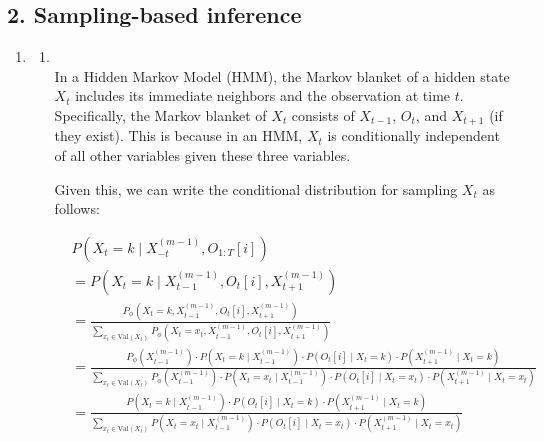 \documentclass[a4 paper]{article}
\begin{document}
\subsection*{2. Sampling-based inference}


\begin{enumerate}
    \item {}
    
    \begin{enumerate}
        \item {} \\

        In a Hidden Markov Model (HMM), the Markov blanket of a hidden state $X_t$ includes its immediate neighbors and the observation at time $t$. Specifically, the Markov blanket of $X_t$ consists of $X_{t-1}$, $O_t$, and $X_{t+1}$ (if they exist). This is because in an HMM, $X_t$ is conditionally independent of all other variables given these three variables. 

        Given this, we can write the conditional distribution for sampling $X_t$ as follows:

        \begin{align*}
            &P(X_t = k \mid X_{-t}^{(m-1)}, O_{1:T}[i]) \\
            &= P(X_t = k \mid X_{t-1}^{(m-1)}, O_t[i], X_{t+1}^{(m-1)}) \\
            &= \frac{P_\phi(X_t = k, X_{t-1}^{(m-1)}, O_t[i], X_{t+1}^{(m-1)})}{\sum_{x_t \in \text{Val}(X_t)} P_\phi(X_t = x_t, X_{t-1}^{(m-1)}, O_t[i], X_{t+1}^{(m-1)})} \\
            &= \frac{P_\phi(X_{t-1}^{(m-1)}) \cdot P(X_t = k \mid X_{t-1}^{(m-1)}) \cdot P(O_t[i] \mid X_t = k) \cdot P(X_{t+1}^{(m-1)} \mid X_t = k)}{\sum_{x_t \in \text{Val}(X_t)} P_\phi(X_{t-1}^{(m-1)}) \cdot P(X_t = x_t \mid X_{t-1}^{(m-1)}) \cdot P(O_t[i] \mid X_t = x_t) \cdot P(X_{t+1}^{(m-1)} \mid X_t = x_t)} \\
            &= \frac{P(X_t = k \mid X_{t-1}^{(m-1)}) \cdot P(O_t[i] \mid X_t = k) \cdot P(X_{t+1}^{(m-1)} \mid X_t = k)}{\sum_{x_t \in \text{Val}(X_t)} P(X_t = x_t \mid X_{t-1}^{(m-1)}) \cdot P(O_t[i] \mid X_t = x_t) \cdot P(X_{t+1}^{(m-1)} \mid X_t = x_t)}
        \end{align*}


\end{enumerate}
\end{enumerate}
\end{document}
